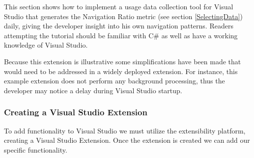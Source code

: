 This section shows how to implement a usage data collection tool for Visual Studio that generates the Navigation Ratio metric (see section \ref{SelectingData}) daily, giving the developer insight into his own navigation patterns. Readers attempting the tutorial should be familiar with C\# as well as have a working knowledge of Visual Studio.  

Because this extension is illustrative some simplifications have been made that would need to be addressed in a widely deployed extension. For instance, this example extension does not perform any background processing, thus the developer may notice a delay during Visual Studio startup.  

\subsubsection{Creating a Visual Studio Extension}

To add functionality to Visual Studio we must utilize the extensibility platform, creating a Visual Studio Extension. Once the extension is created we can add our specific functionality.

